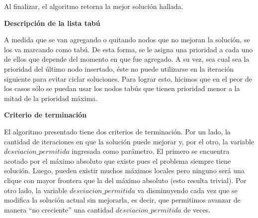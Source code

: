 Al finalizar, el algoritmo retorna la mejor solución hallada. \newline

\textbf{Descripción de la lista tabú} \newline

 A medida que se van agregando o quitando nodos que no mejoran la solución, se los va marcando como tabú. De esta forma, se le asigna una prioridad a cada uno de ellos que depende del momento en que fue agregado. A su vez, sea cual sea la prioridad del último nodo insertado, éste no puede utilizarse en la iteración siguiente para evitar ciclar soluciones. Para lograr esto, hicimos que en el peor de los casos sólo se puedan usar los nodos tabús que tienen prioridad menor a la mitad de la prioridad máxima.\newline

\textbf{Criterio de terminación} \newline

 El algoritmo presentado tiene dos criterios de terminación. Por un lado, la cantidad de iteraciones en que la solución puede mejorar y, por el otro, la variable $desviacion\_permitida$ ingresada como parámetro. El primero se encuentra acotado por el máximo absoluto que existe pues el problema siempre tiene solución. Luego, pueden existir muchos máximos locales pero ninguno será una clique con mayor frontera que la del máximo absoluto (esto resulta trivial). Por otro lado, la variable $desviacion\_permitida$ va disminuyendo cada vez que se modifica la solución actual sin mejorarla, es decir, que permitimos avanzar de manera ``no creciente'' una cantidad $desviacion\_permitida$ de veces. \newline


